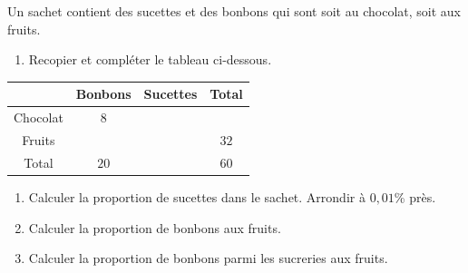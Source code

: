 \begin{exo}{}
	Un sachet contient des sucettes et des bonbons qui sont soit au chocolat, soit aux fruits.

	\begin{enumerate}
		\item Recopier et compléter le tableau ci-dessous.
	\end{enumerate}
	\begin{center}
		\def\arraystretch{1.5}
		\begin{tabular}{|c|c|c|c|}
			\hline
			                            & \cellcolor{gray!30}Bonbons & \cellcolor{gray!30}Sucettes & \cellcolor{gray!30}Total \\ \hline
			\cellcolor{gray!30}Chocolat & $8$                        &                             &                          \\ \hline
			\cellcolor{gray!30}Fruits   &                            &                             & $32$                     \\ \hline
			\cellcolor{gray!30}Total    & $20$                       &                             & $60$                     \\ \hline
		\end{tabular}
	\end{center}
	\begin{enumerate}[resume]
		\item Calculer la proportion de sucettes dans le sachet. Arrondir à $0,01$\% près.
		\item Calculer la proportion de bonbons aux fruits.
		\item Calculer la proportion de bonbons parmi les sucreries aux fruits.
	\end{enumerate}
\end{exo}
